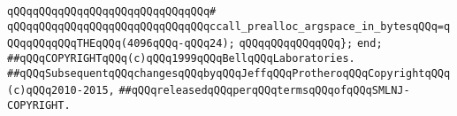 \verb|qQQqqQQqqQQqqQQqqQQqqQQqqQQqqQQq#|\newline
\verb|qQQqqQQqqQQqqQQqqQQqqQQqqQQqqQQqccall_prealloc_argspace_in_bytesqQQq=qQQqqQQqqQQqTHEqQQq(4096qQQq-qQQq24);|\newline
\verb|qQQqqQQqqQQqqQQq};|\newline
\verb|end;|\newline
\newline
\newline
\verb|##qQQqCOPYRIGHTqQQq(c)qQQq1999qQQqBellqQQqLaboratories.|\newline
\verb|##qQQqSubsequentqQQqchangesqQQqbyqQQqJeffqQQqProtheroqQQqCopyrightqQQq(c)qQQq2010-2015,|\newline
\verb|##qQQqreleasedqQQqperqQQqtermsqQQqofqQQqSMLNJ-COPYRIGHT.|\newline

